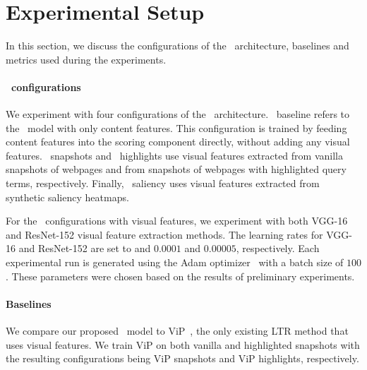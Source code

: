 
\section{Experimental Setup}\label{sec:setup}
In this section, we discuss the configurations of the \modelname~architecture, baselines and metrics used during the experiments.


\paragraph{\modelname~configurations}
We experiment with four configurations of the \modelname~architecture.
\modelname~baseline refers to the \modelname~model with only content features.
This configuration is trained by feeding content features into the scoring component directly, without adding any visual features.
\modelname~snapshots and \modelname~highlights use visual features extracted from vanilla snapshots of webpages and from snapshots of webpages with highlighted query terms, respectively.
Finally, \modelname~saliency uses visual features extracted from synthetic saliency heatmaps.

For the \modelname~configurations with visual features, we experiment with both VGG-16 and ResNet-152 visual feature extraction methods.
The learning rates for VGG-16 and ResNet-152 are set to and $0.0001$ and $0.00005$, respectively. 
Each experimental run is generated using the Adam optimizer~\cite{kingma2014adam} with a batch size of $100$. These parameters were chosen based on the results of preliminary experiments.


\paragraph{Baselines}
We compare our proposed \modelname~model to ViP~\citet{fan2017learning}, the only existing \ac{LTR} method that uses visual features.
We train ViP on both vanilla and highlighted snapshots with the resulting configurations being ViP snapshots and ViP highlights, respectively.

